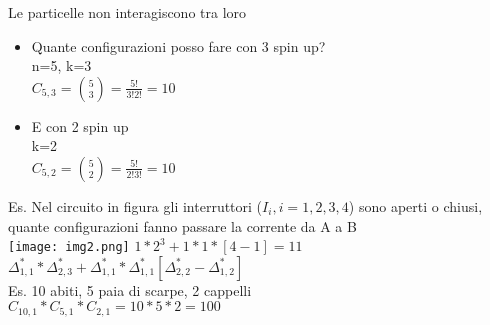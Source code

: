 \documentclass{report}
\begin{document}
\begin{itemize}
      Le particelle non interagiscono tra loro
      \begin{itemize}
        \item Quante configurazioni posso fare con 3 spin up?\\n=5, k=3\\$C_{5,3} = \binom{5}{3}=\frac{5!}{3!2!}=10$
        \item E con 2 spin up\\k=2\\$C_{5,2} = \binom{5}{2}=\frac{5!}{2!3!}=10$
      \end{itemize}
      Es. Nel circuito in figura gli interruttori ($I_i,i=1,2,3,4$) sono aperti o chiusi, quante configurazioni fanno passare la corrente da A a B\\
      \texttt{[image: img2.png]}
      $1*2^3+1*1*[4-1]=11$\\
      $\Delta_{1,1}^* * \Delta_{2,3}^* + \Delta_{1,1}^* * \Delta_{1,1}^* [\Delta_{2,2}^*-\Delta_{1,2}^*]$
      \\
      Es. 10 abiti, 5 paia di scarpe, 2 cappelli\\
      $C_{10,1}*C_{5,1}*C_{2,1}=10*5*2=100$
\end{itemize}
\end{document}
